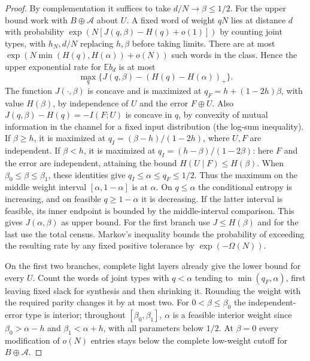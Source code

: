 \begin{proof}
By complementation it suffices to take \(d/N\to\beta\le1/2\). For the upper bound work with \(B\oplus\mathcal A\) about \(U\). A fixed word of weight \(qN\) lies at distance \(d\) with probability \(\exp(N[J(q,\beta)-H(q)+o(1)])\) by counting joint types, with \(h_N,d/N\) replacing \(h,\beta\) before taking limits. There are at most \(\exp(N\min(H(q),H(\alpha))+o(N))\) such words in the class. Hence the upper exponential rate for \(\mathbb E b_d\) is at most
\[
 \max_q\{J(q,\beta)-(H(q)-H(\alpha))_+\}.
\]
The function \(J(\cdot,\beta)\) is concave and is maximized at \(q_F=h+(1-2h)\beta\), with value \(H(\beta)\), by independence of \(U\) and the error \(F\oplus U\).
Also \(J(q,\beta)-H(q)=-I(F;U)\) is concave in \(q\), by convexity of mutual information in the channel for a fixed input distribution (the log-sum inequality). If \(\beta\ge h\), it is maximized at \(q_I=(\beta-h)/(1-2h)\), where \(U,F\) are independent. If \(\beta<h\), it is maximized at \(q_I=(h-\beta)/(1-2\beta)\): here \(F\) and the error are independent, attaining the bound \(H(U\mid F)\le H(\beta)\). When \(\beta_0\le\beta\le\beta_1\), these identities give \(q_I\le\alpha\le q_F\le1/2\). Thus the maximum on the middle weight interval \([\alpha,1-\alpha]\) is at \(\alpha\). On \(q\le\alpha\) the conditional entropy is increasing, and on feasible \(q\ge1-\alpha\) it is decreasing. If the latter interval is feasible, its inner endpoint is bounded by the middle-interval comparison. This gives \(J(\alpha,\beta)\) as upper bound. For the first branch use \(J\le H(\beta)\) and for the last use the total census. Markov's inequality bounds the probability of exceeding the resulting rate by any fixed positive tolerance by \(\exp(-\Omega(N))\).

On the first two branches, complete light layers already give the lower bound for every \(U\). Count the words of joint types with \(q<\alpha\) tending to \(\min(q_F,\alpha)\), first leaving fixed slack for synthesis and then shrinking it. Rounding the weight with the required parity changes it by at most two. For \(0<\beta\le\beta_0\) the independent-error type is interior; throughout \([\beta_0,\beta_1]\), \(\alpha\) is a feasible interior weight since \(\beta_0>\alpha-h\) and \(\beta_1<\alpha+h\), with all parameters below \(1/2\). At \(\beta=0\) every modification of \(o(N)\) entries stays below the complete low-weight cutoff for \(B\oplus\mathcal A\).


\end{proof}
